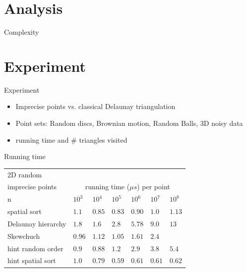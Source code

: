 \documentclass{beamer}
\begin{document}
\section{Analysis}
\frame{\tableofcontents[currentsection]}

\begin{frame}

\end{frame}

\begin{frame}{Complexity}

\end{frame}

\section{Experiment}
\frame{\tableofcontents[currentsection]}
\begin{frame}{Experiment}
\begin{itemize}
\item Imprecise points vs. classical Delaunay triangulation
\item Point sets: Random discs, Brownian motion, Random Balls, 3D noisy data
\item running time and \# triangles visited
\end{itemize}
\end{frame}

\begin{frame}{Running time}
\begin{tabular}{|l||l|l|l|l|l|l|}
\hline
2D random \\
imprecise points & \multicolumn{6}{|c|}{running time  ($\mu s$) per point}\\
 \hline \hline
    n & $10^3$ & $10^4$ & $10^5$ & $10^6$ & $10^7$ & $10^8$\\\hline
    spatial sort & $1.1$ & $0.85 $ & $0.83 $ & $0.90 $ & $1.0 $ & $1.13$\\\hline
    Delaunay hierarchy & $1.8$ & $1.6$ & $2.8 $ & $5.78 $ & $9.0$ & $13$\\\hline
    Skewchuch & $0.96 $ & $1.12$ & $1.05 $ & $1.61 $ & $2.4$ &\\\hline
    hint random order & $0.9 $ & $0.88 $ & $1.2 $ & $2.9 $ & $3.8$ & $5.4$\\\hline
    hint spatial sort & $1.0 $ & $0.79$ & $0.59$ & $0.61 $ & $0.61 $ & $0.62$\\\hline
\end{tabular}
\end{frame}
\end{document}
